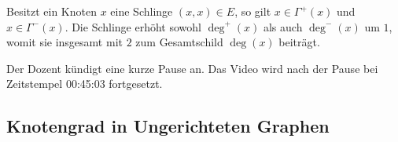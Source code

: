 \begin{math-stroke}

\begin{example}
Besitzt ein Knoten $x$ eine Schlinge $(x, x) \in E$, so gilt $x \in \Gamma^+(x)$ und $x \in \Gamma^-(x)$. Die Schlinge erhöht sowohl $\operatorname{deg}^+(x)$ als auch $\operatorname{deg}^-(x)$ um $1$, womit sie insgesamt mit $2$ zum Gesamtschild $\operatorname{deg}(x)$ beiträgt.
\end{example}
\end{math-stroke}

\begin{lecture-break}[Vorlesungspause]
Der Dozent kündigt eine kurze Pause an. Das Video wird nach der Pause bei Zeitstempel 00:45:03 fortgesetzt.
\end{lecture-break}

\subsection{Knotengrad in Ungerichteten Graphen}

